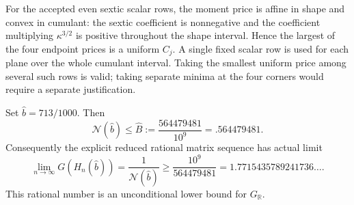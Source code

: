 \documentclass{article}
\newcommand{\N}{\mathcal N}
\begin{document}
\begin{remark}
For the accepted even sextic scalar rows, the moment price is affine in
shape and convex in cumulant: the sextic coefficient is nonnegative and
the coefficient multiplying $\kappa^{3/2}$ is positive throughout the
shape interval. Hence the largest of the four endpoint prices is a
uniform $C_j$. A single fixed scalar row is used for each plane over the
whole cumulant interval. Taking the smallest uniform price among several
such rows is valid; taking separate minima at the four corners would
require a separate justification.
\end{remark}
\begin{theorem}
\label{thm:final-preferred-polygon}
Set $\widehat b=713/1000$. Then
\[
 \N(\widehat b)\le\widehat B:=\frac{564479481}{10^9}=.564479481.
\]
Consequently the explicit reduced rational matrix sequence has actual limit
\[
 \lim_{n\to\infty}G(H_n(\widehat b))
 =\frac1{\N(\widehat b)}
 \ge\frac{10^9}{564479481}
 =1.7715435789241736\ldots .
\]
This rational number is an unconditional lower bound for $G_{\mathbb R}$.
\end{theorem}
\end{document}
